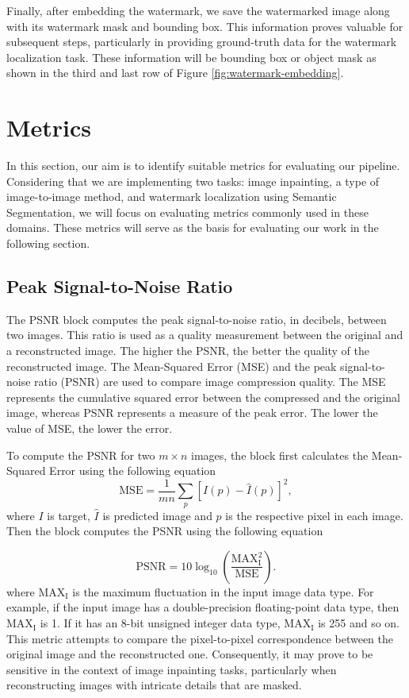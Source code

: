 Finally, after embedding the watermark, we save the watermarked image along with its watermark mask and bounding box. This information proves valuable for subsequent steps, particularly in providing ground-truth data for the watermark localization task. These information will be bounding box or object mask as shown in the third and last row of Figure \ref{fig:watermark-embedding}.

\section{Metrics}
\label{sec:metrics}
In this section, our aim is to identify suitable metrics for evaluating our pipeline. Considering that we are implementing two tasks: image inpainting, a type of image-to-image method, and watermark localization using Semantic Segmentation, we will focus on evaluating metrics commonly used in these domains. These metrics will serve as the basis for evaluating our work in the following section.

\subsection{Peak Signal-to-Noise Ratio}

The PSNR block computes the peak signal-to-noise ratio, in decibels, between two images. This ratio is used as a quality measurement between the original and a reconstructed image. The higher the PSNR, the better the quality of the reconstructed image. The Mean-Squared Error (MSE) and the peak signal-to-noise ratio (PSNR) are used to compare image compression quality. The MSE represents the cumulative squared error between the compressed and the original image, whereas PSNR represents a measure of the peak error. The lower the value of MSE, the lower the error.

To compute the PSNR for two $m \times n$ images, the block first calculates the Mean-Squared Error using the following equation
\begin{equation}
    \text{MSE} = \dfrac{1}{mn}\sum\limits_{p}[I(p)-\hat{I}(p)]^2,
\end{equation}
where $I$ is target, $\hat{I}$ is predicted image and $p$ is the respective pixel in each image. Then the block computes the PSNR using the following equation

\begin{equation}
    \text{PSNR} = 10\log_{10}\left(\dfrac{\text{MAX}_\text{I}^2}{\text{MSE}}\right).
\end{equation}
where $\text{MAX}_\text{I}$ is the maximum fluctuation in the input image data type. For example, if the input image has a double-precision floating-point data type, then $\text{MAX}_\text{I}$ is 1. If it has an 8-bit unsigned integer data type, $\text{MAX}_\text{I}$ is 255 and so on. This metric attempts to compare the pixel-to-pixel correspondence between the original image and the reconstructed one. Consequently, it may prove to be sensitive in the context of image inpainting tasks, particularly when reconstructing images with intricate details that are masked.

